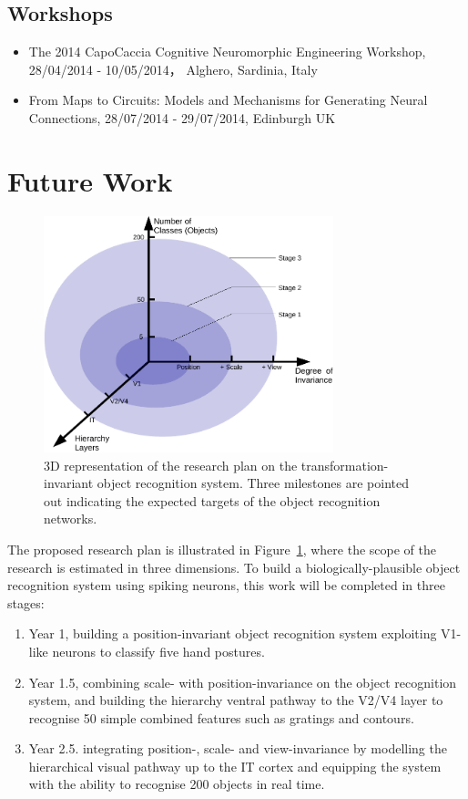 \subsection{Workshops}
\begin{itemize}
	\item The 2014 CapoCaccia Cognitive Neuromorphic Engineering Workshop,\\ 28/04/2014 - 10/05/2014， Alghero, Sardinia, Italy 
	\item From Maps to Circuits: Models and Mechanisms for Generating Neural Connections, 28/07/2014 - 29/07/2014, Edinburgh UK
\end{itemize}
\section{Future Work} 
\begin{figure}[h!]
	\centering
	\includegraphics[width=0.75\textwidth]{pics/stages.pdf}
	\caption{3D representation of the research plan on the transformation-invariant object recognition system.
	Three milestones are pointed out indicating the expected targets of the object recognition networks.
	}
	\label{Fig:3Dplan}
\end{figure}
The proposed research plan is illustrated in Figure~\ref{Fig:3Dplan}, where the scope of the research is estimated in three dimensions.
To build a biologically-plausible object recognition system using spiking neurons, this work will be completed in three stages:
\begin{enumerate}
	\item Year 1, building a position-invariant object recognition system exploiting V1-like neurons to classify five hand postures. 
	\item Year 1.5, combining scale- with position-invariance on the object recognition system, and building the hierarchy ventral pathway to the V2/V4 layer to recognise 50 simple combined features such as gratings and contours.
	\item Year 2.5. integrating position-, scale- and view-invariance by modelling the hierarchical visual pathway up to the IT cortex and equipping the system with the ability to recognise 200 objects in real time.
\end{enumerate}
 
